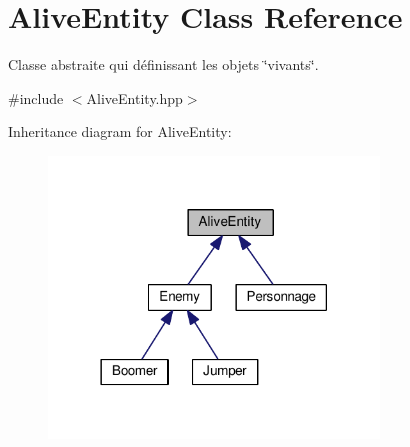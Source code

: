 \hypertarget{class_alive_entity}{\section{Alive\+Entity Class Reference}
\label{class_alive_entity}
}


Classe abstraite qui définissant les objets \char`\"{}vivants\char`\"{}.  




{\ttfamily \#include $<$Alive\+Entity.\+hpp$>$}



Inheritance diagram for Alive\+Entity\+:
\nopagebreak
\begin{figure}[H]
\begin{center}
\leavevmode
\includegraphics[width=249pt]{class_alive_entity__inherit__graph}
\end{center}
\end{figure}
